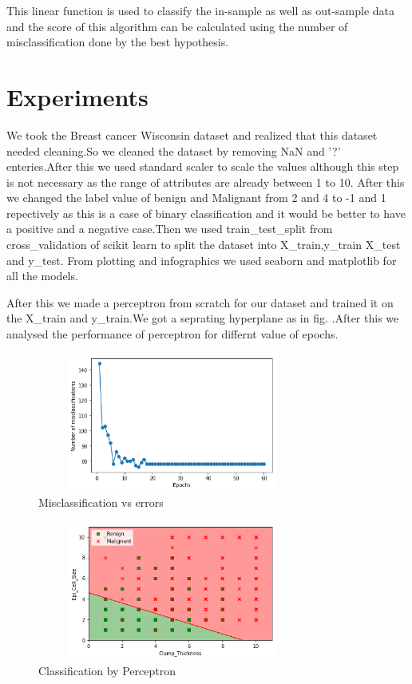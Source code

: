 \documentclass[conference,compsoc]{IEEEtran}
\begin{document}
This linear function is used to classify the in-sample as well as out-sample data and the score of this algorithm can be calculated using the number of misclassification done by the best hypothesis.




\section{Experiments}
We took the Breast cancer Wisconsin dataset and realized that this dataset needed cleaning.So we cleaned the dataset by removing NaN and '?' enteries.After this we used standard scaler to scale the values although this step is not necessary as the range of attributes are already between 1 to 10. After this we changed the label value of benign and Malignant from 2 and 4 to -1 and 1 repectively as this is a case of binary classification and it would be better to have a positive and a negative case.Then we used train\_test\_split from cross\_validation of scikit learn to split the dataset into X\_train,y\_train X\_test and y\_test.
From plotting and infographics we used seaborn and matplotlib for all the models.
\par
 After this we made a perceptron from scratch for our dataset and trained it on the X\_train and y\_train.We got a seprating hyperplane as in fig. .After this we analysed the performance of perceptron for differnt value of epochs.
 \begin{figure}[H]
\centering
\includegraphics[width=3.5in,height=1.8in]{p2.png}
\caption{Misclassification vs errors}
\label{fig_error}

\end{figure}
\begin{figure}[H]
\centering
\includegraphics[width=3.5in,height=1.8in]{p3.png}
\caption{Classification by Perceptron}
\label{fig_error}

\end{figure}    
\end{document}
